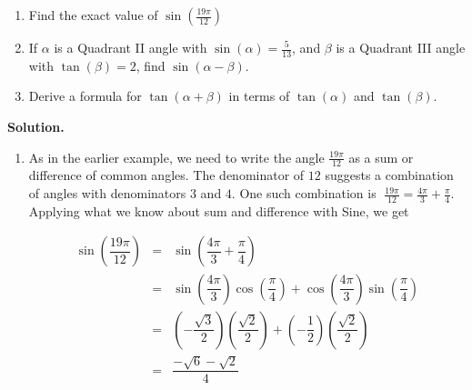 \documentclass{ximera}
\begin{document}
\begin{example} $~$  \label{sinesumanddiffex}

\begin{enumerate}

\item  Find the exact value of $\sin\left(\frac{19 \pi}{12}\right)$

\item  If $\alpha$ is a Quadrant II angle with $\sin(\alpha) = \frac{5}{13}$, and $\beta$ is a Quadrant III angle with $\tan(\beta) = 2$, find $\sin(\alpha - \beta)$.

\item  Derive a formula for $\tan(\alpha + \beta)$ in terms of $\tan(\alpha)$ and $\tan(\beta)$.

\end{enumerate}

{\bf Solution.}  

\begin{enumerate}

\item  As in the earlier example, we need to write the angle $\frac{19 \pi}{12}$ as a sum or difference of common angles.  The denominator of $12$ suggests a combination of angles with denominators $3$ and $4$.  One such combination is $\; \frac{19 \pi}{12} = \frac{4 \pi}{3} + \frac{\pi}{4}$.  Applying what we know about sum and difference with Sine, we get

\vspace{-.15in}

\[ \begin{array}{rcl}

\sin\left(\dfrac{19 \pi}{12}\right) & = & \sin\left(\dfrac{4 \pi}{3} + \dfrac{\pi}{4} \right) \\ [10pt]
                            & = & \sin\left(\dfrac{4 \pi}{3} \right)\cos\left(\dfrac{\pi}{4} \right) + \cos\left(\dfrac{4 \pi}{3} \right)\sin\left(\dfrac{\pi}{4} \right) \\ [10pt]
                            & = & \left( -\dfrac{\sqrt{3}}{2} \right)\left( \dfrac{\sqrt{2}}{2} \right)  +  \left( -\dfrac{1}{2} \right)\left( \dfrac{\sqrt{2}}{2} \right) \\ [15pt]
														& = &  \dfrac{-\sqrt{6}- \sqrt{2}}{4} \\
\end{array} \]

\vspace{-.1in}


\end{enumerate}
\end{example}
\end{document}
